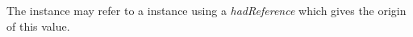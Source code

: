 
The  instance may refer to a  instance using a \textit{hadReference} which gives the origin of this value.
